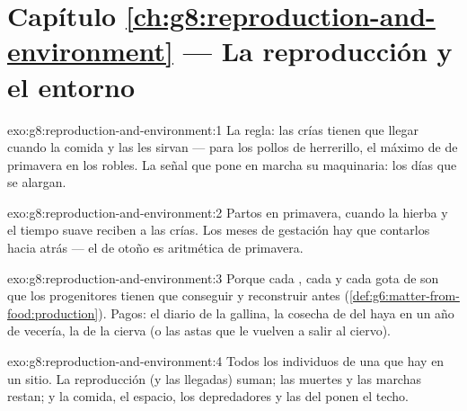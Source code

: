 \section*{Capítulo \ref{ch:g8:reproduction-and-environment} --- La reproducción y el entorno}

\begin{solution}{exo:g8:reproduction-and-environment:1}
La regla: las crías tienen que llegar cuando la comida y las
 les sirvan --- para los pollos de herrerillo, el máximo de
 de primavera en los robles. La señal que pone en marcha su
maquinaria: los días que se alargan.
\end{solution}

\begin{solution}{exo:g8:reproduction-and-environment:2}
Partos en primavera, cuando la hierba y el tiempo suave reciben a las
crías. Los meses de gestación hay que contarlos hacia atrás --- el
 de otoño es aritmética de primavera.
\end{solution}

\begin{solution}{exo:g8:reproduction-and-environment:3}
Porque cada , cada  y cada gota de  son  que los progenitores tienen que conseguir y reconstruir antes
(\cref{def:g6:matter-from-food:production}). Pagos: el  diario de
la gallina, la cosecha de  del haya en un año de vecería, la
 de la cierva (o las astas que le vuelven a salir al ciervo).
\end{solution}

\begin{solution}{exo:g8:reproduction-and-environment:4}
Todos los individuos de una  que hay en un sitio. La
reproducción (y las llegadas) suman; las muertes y las marchas restan;
y la comida, el espacio, los depredadores y las  del 
ponen el techo.
\end{solution}

